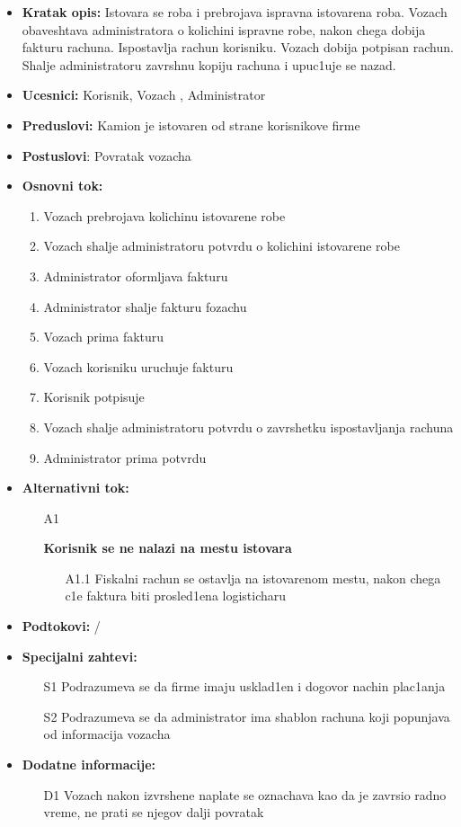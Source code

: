 \begin{itemize}
	\item {\textbf{Kratak opis:}  Istovara se roba i prebrojava ispravna istovarena roba. Vozach obaveshtava administratora o kolichini ispravne robe, nakon chega dobija fakturu rachuna. Ispostavlja rachun korisniku. Vozach dobija potpisan rachun. Shalje administratoru zavrshnu kopiju rachuna i upuc1uje se nazad.}
	\item{\textbf{Ucesnici:} Korisnik, Vozach , Administrator}
	\item{\textbf{Preduslovi:} Kamion je istovaren od strane korisnikove firme }
	\item{\textbf{Postuslovi}: Povratak vozacha}
	\item{\textbf{Osnovni tok:}  \begin{enumerate}
				\item {Vozach prebrojava kolichinu istovarene robe}
				\item{Vozach shalje administratoru potvrdu o kolichini istovarene robe}
				\item{Administrator oformljava fakturu}
				\item{Administrator shalje fakturu fozachu}
				\item{Vozach prima fakturu}
				\item{Vozach korisniku uruchuje fakturu}
				\item {Korisnik potpisuje}
				\item{Vozach shalje administratoru potvrdu o zavrshetku ispostavljanja rachuna}
				\item {Administrator prima potvrdu}
	\end{enumerate}
			}
\item{\textbf{Alternativni tok:}
	 \begin{enumerate}
		\item[A{1}]{\textbf{Korisnik se ne nalazi na mestu istovara} 
			\begin{itemize}
				\item[A{1.1}]{Fiskalni rachun se ostavlja na istovarenom mestu, nakon chega c1e faktura biti prosled1ena logisticharu}
			\end{itemize}	
						}
	\end{enumerate}
		}
\item{\textbf{Podtokovi:} /}
\item{\textbf{Specijalni zahtevi:} 
			\begin{itemize}
				\item[S{1}]{Podrazumeva se da firme imaju usklad1en i dogovor nachin plac1anja}
				\item[S{2}]{Podrazumeva se da administrator ima shablon rachuna koji popunjava od informacija vozacha}
		\end{itemize}
	
}
\item{\textbf{Dodatne informacije:} 
					\begin{itemize}
						\item[D{1}]{Vozach nakon izvrshene naplate se oznachava kao da je zavrsio radno vreme, ne prati se njegov dalji povratak}
					\end{itemize}
}

\end{itemize}
